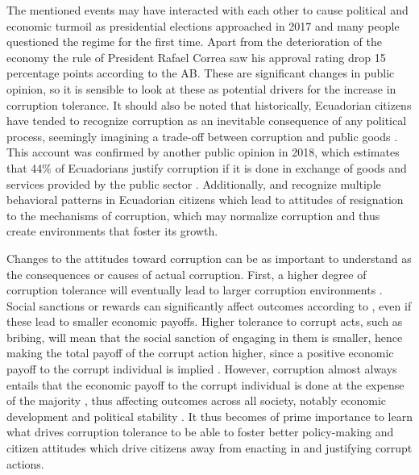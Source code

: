 \documentclass[floatsintext,man]{apa7}\usepackage[]{graphicx}\usepackage[]{color}
\begin{document}
The mentioned events may have interacted with each other to cause political and economic turmoil as presidential elections approached in 2017 and many people questioned the regime for the first time. Apart from the deterioration of the economy the rule of President Rafael Correa saw his approval rating drop 15 percentage points according to the AB. These are significant changes in public opinion, so it is sensible to look at these as potential drivers for the increase in corruption tolerance. It should also be noted that historically, Ecuadorian citizens have tended to recognize corruption as an inevitable consequence of any political process, seemingly imagining a trade-off between corruption and public goods \parencite{Adoum.2000}. This account was confirmed by another public opinion in 2018, which estimates that 44\% of Ecuadorians justify corruption if it is done in exchange of goods and services provided by the public sector \parencite{Loaiza.2019}. Additionally, \textcite{Hurtado.2007} and \textcite{Adoum.2000} recognize multiple behavioral patterns in Ecuadorian citizens which lead to attitudes of resignation to the mechanisms of corruption, which may normalize corruption and thus create environments that foster its growth. 

Changes to the attitudes toward corruption can be as important to understand as the consequences or causes of actual corruption. First, a higher degree of corruption tolerance will eventually lead to larger corruption environments \parencite{Campbell.2014}. Social sanctions or rewards can significantly affect outcomes according to \textcite{Akerlof.1980}, even if these lead to smaller economic payoffs. Higher tolerance to corrupt acts, such as bribing, will mean that the social sanction of engaging in them is smaller, hence making the total payoff of the corrupt action higher, since a positive economic payoff to the corrupt individual is implied \parencite{Shleifer.1993}. However, corruption almost always entails that the economic payoff to the corrupt individual is done at the expense of the majority \parencite{Warren.2004}, thus affecting outcomes across all society, notably economic development and political stability \parencite{Singer.2016}. It thus becomes of prime importance to learn what drives corruption tolerance to be able to foster better policy-making and citizen attitudes which drive citizens away from enacting in and justifying corrupt actions.
\clearpage
\end{document}
